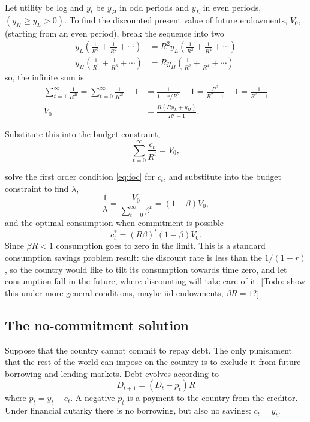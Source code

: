 \documentclass[11pt, pdftex]{article}
\begin{document}
Let utility be log and ${y_t}$ be ${y_H}$ in odd periods and ${y_L}$ in even periods, $\left( {{y_H} \geqslant {y_L} > 0} \right)$. To find the discounted present value of future endowments, $V_0$, (starting from an even period), break the sequence into two
\begin{align*}
    {y_L}\left( {\frac{1}{{{R^0}}} + \frac{1}{{{R^2}}} +  \cdots } \right) &= {R^2}{y_L}\left( {\frac{1}{{{R^2}}} + \frac{1}{{{R^4}}} +  \cdots } \right)	\\
	{y_H}\left( {\frac{1}{{{R^1}}} + \frac{1}{{{R^3}}} +  \cdots } \right)& = R{y_H}\left( {\frac{1}{{{R^2}}} + \frac{1}{{{R^4}}} +  \cdots } \right)
\end{align*}
so, the infinite sum is
\begin{align}
\sum\limits_{t = 1}^\infty  {\frac{1}{{{R^{2t}}}}} =  \sum\limits_{t = 0}^\infty  {\frac{1}{{{R^{2t}}}}}  - 1 &= \frac{1}{1-r/R^2} - 1 = \frac{{{R^2}}}{{{R^2} - 1}} - 1 = \frac{1}{{{R^2} - 1}}\\
{V_0}& = \frac{{R\left( {R{y_L} + {y_H}} \right)}}{{{R^2} - 1}}.
\end{align}	

Substitute this into the budget constraint,
\begin{equation*}
\sum\limits_{t = 0}^\infty  {\frac{{{c_t}}}{{{R^t}}}}  = {V_0},
\end{equation*}

solve the first order condition \eqref{eq:foc} for $c_t$, and substitute into the budget constraint to find $\lambda$,
	\[\frac{1}{\lambda } = \frac{{{V_0}}}{{\sum\limits_{t = 0}^\infty  {{\beta ^t}} }} = \left( {1 - \beta } \right){V_0},\]
and the optimal consumption when commitment is possible
\begin{equation}\label{eq:opt_c}
c_t^* = {\left( {R\beta } \right)^t}\left( {1 - \beta } \right){V_0}.
\end{equation}
Since $\beta R < 1$ consumption goes to zero in the limit.  This is a standard consumption savings problem result: the discount rate is less than the $1/(1+r)$, so the country would like to tilt its consumption towards time zero, and let consumption fall in the future, where discounting will take care of it.  [Todo: show this under more general conditions, maybe iid endowments, $\beta R = 1$?]

\subsection{The no-commitment solution}
Suppose that the country cannot commit to repay debt. The only punishment that the rest of the world can impose on the country is to exclude it from future borrowing and lending markets.  Debt evolves according to
\begin{equation}
{D_{t + 1}} = \left( {{D_t} - {p_t}} \right)R
\end{equation}
where ${p_t} = {y_t} - {c_t}$.  A negative ${p_t}$ is a payment to the country from the creditor.  Under financial autarky there is no borrowing, but also no savings: ${c_t} = {y_t}$.
\end{document}
